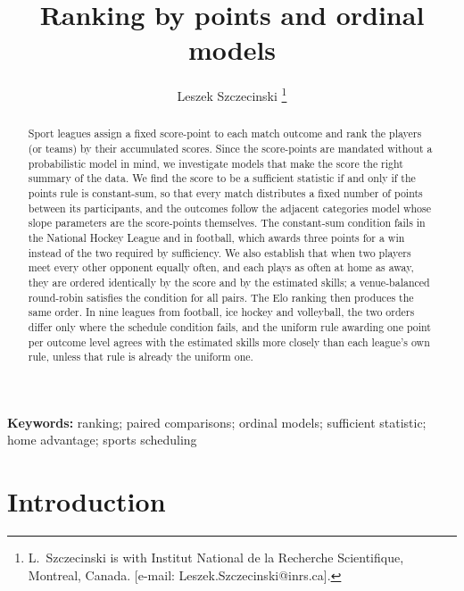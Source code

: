 \documentclass[letterpaper,12pt]{article}
\begin{document}
\title{
Ranking by points and ordinal models
}
\author{Leszek Szczecinski
\thanks{%
L.~Szczecinski  is with Institut National de la Recherche Scientifique, Montreal, Canada. [e-mail: Leszek.Szczecinski@inrs.ca].}%
}%

\originalmaketitle  %


\begin{abstract}
Sport leagues assign a fixed score-point to each match outcome and rank the players (or teams) by their accumulated scores. Since the score-points are mandated without a probabilistic model in mind, we investigate models that make the score the right summary of the data. We find the score to be a sufficient statistic if and only if the points rule is constant-sum, so that every match distributes a fixed number of points between its participants, and the outcomes follow the adjacent categories model whose slope parameters are the score-points themselves. The constant-sum condition fails in the National Hockey League and in football, which awards three points for a win instead of the two required by sufficiency. We also establish that when two players meet every other opponent equally often, and each plays as often at home as away, they are ordered identically by the score and by the estimated skills; a venue-balanced round-robin satisfies the condition for all pairs. The Elo ranking then produces the same order. In nine leagues from football, ice hockey and volleyball, the two orders differ only where the schedule condition fails, and the uniform rule awarding one point per outcome level agrees with the estimated skills more closely than each league's own rule, unless that rule is already the uniform one.
\end{abstract}

\begingroup{}%
\noindent\textbf{Keywords:} ranking; paired comparisons; ordinal models; sufficient statistic; home advantage; sports scheduling
\par\endgroup

\section{Introduction}\label{Sec:Intro}
\end{document}
